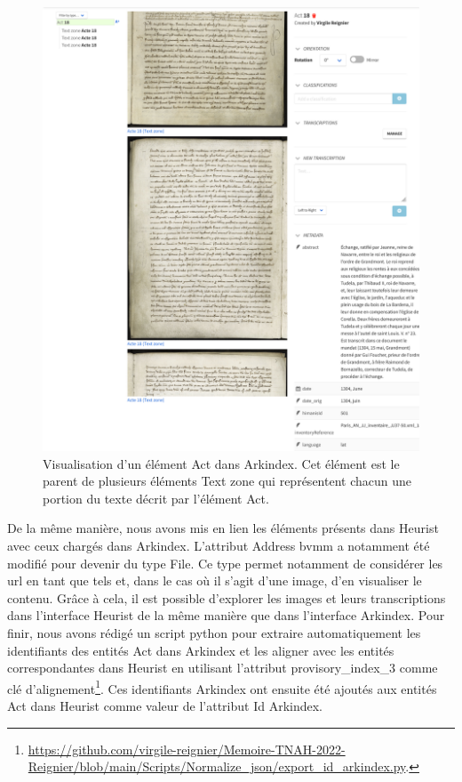\documentclass[a4paper,12pt,twoside]{book}
\begin{document}
	\begin{figure}
		\centering
		\includegraphics[width=12cm]{Images/Act_on_Arkindex.png}
		\caption{Visualisation d'un élément \og Act\fg{} dans Arkindex. Cet élément est le parent de plusieurs éléments \og Text zone\fg{} qui représentent chacun une portion du texte décrit par l'élément \og Act\fg{}.}
		\label{Act_on_Arkindex}
	\end{figure}

	De la même manière, nous avons mis en lien les éléments présents dans Heurist avec ceux chargés dans Arkindex. L'attribut \og Address bvmm\fg{} a notamment été modifié pour devenir du type \og File\fg{}. Ce type permet notamment de considérer les url en tant que tels et, dans le cas où il s'agit d'une image, d'en visualiser le contenu. Grâce à cela, il est possible d'explorer les images et leurs transcriptions dans l'interface Heurist de la même manière que dans l'interface Arkindex. Pour finir, nous avons rédigé un script python pour extraire automatiquement les identifiants des entités Act dans Arkindex et les aligner avec les entités correspondantes dans Heurist en utilisant l'attribut \og provisory\_index\_3\fg{} comme clé d'alignement\footnote{\url{https://github.com/virgile-reignier/Memoire-TNAH-2022-Reignier/blob/main/Scripts/Normalize_json/export_id_arkindex.py}.}. Ces identifiants Arkindex ont ensuite été ajoutés aux entités Act dans Heurist comme valeur de l'attribut \og Id Arkindex\fg{}.
	
\end{document}
